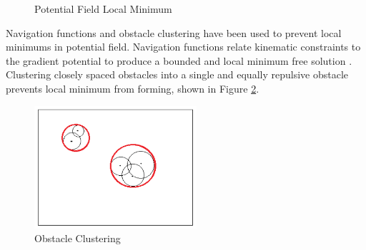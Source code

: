 \documentclass[numbered,pdftex]{ohio-etd}
\begin{document}
\begin{figure}[H]
	\begin{subfigmatrix}{2}%
		\centering
	\end{subfigmatrix}
	\caption{Potential Field Local Minimum \cite{liu_virtual-waypoint_2016}}
	\label{fig:vff}
\end{figure}

Navigation functions \cite{goerzen_survey_2010} and obstacle clustering \cite{liu_virtual-waypoint_2016} have been used to prevent local minimums in potential field. Navigation functions relate kinematic constraints to the gradient potential to produce a bounded and local minimum free solution \cite{rimon_exact_1992}. Clustering closely spaced obstacles into a single and equally repulsive obstacle prevents local minimum from forming, shown in Figure \ref{fig:obstacleclustering}.  

\begin{figure}[H]
	\centering
	\includegraphics[width=6cm]{PaperFigures/obstacleClustering}
	\caption{Obstacle Clustering \cite{liu_virtual-waypoint_2016}}
	\label{fig:obstacleclustering}
\end{figure}
\end{document}
